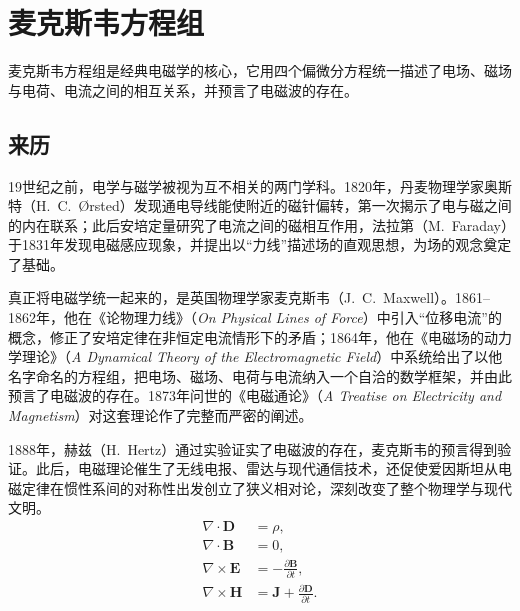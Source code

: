 \documentclass{ctexart} %
\begin{document}
\section{麦克斯韦方程组}

麦克斯韦方程组是经典电磁学的核心，它用四个偏微分方程统一描述了电场、磁场与电荷、电流之间的相互关系，并预言了电磁波的存在\cite{maxwell1865}。
\subsection*{来历}
19世纪之前，电学与磁学被视为互不相关的两门学科。1820年，丹麦物理学家奥斯特（H.~C.~Ørsted）发现通电导线能使附近的磁针偏转，第一次揭示了电与磁之间的内在联系；此后安培定量研究了电流之间的磁相互作用，法拉第（M.~Faraday）于1831年发现电磁感应现象，并提出以“力线”描述场的直观思想，为场的观念奠定了基础。

真正将电磁学统一起来的，是英国物理学家麦克斯韦（J.~C.~Maxwell）。1861--1862年，他在《论物理力线》（\textit{On Physical Lines of Force}）中引入“位移电流”的概念，修正了安培定律在非恒定电流情形下的矛盾；1864年，他在《电磁场的动力学理论》（\textit{A Dynamical Theory of the Electromagnetic Field}）中系统给出了以他名字命名的方程组\cite{maxwell1865}，把电场、磁场、电荷与电流纳入一个自洽的数学框架，并由此预言了电磁波的存在。1873年问世的《电磁通论》（\textit{A Treatise on Electricity and Magnetism}）对这套理论作了完整而严密的阐述。

1888年，赫兹（H.~Hertz）通过实验证实了电磁波的存在，麦克斯韦的预言得到验证。此后，电磁理论催生了无线电报、雷达与现代通信技术，还促使爱因斯坦从电磁定律在惯性系间的对称性出发创立了狭义相对论，深刻改变了整个物理学与现代文明。
\begin{equation}
\begin{split}
    \nabla \cdot \mathbf{D} &= \rho, \\
    \nabla \cdot \mathbf{B} &= 0, \\
    \nabla \times \mathbf{E} &= -\frac{\partial \mathbf{B}}{\partial t}, \\
    \nabla \times \mathbf{H} &= \mathbf{J} + \frac{\partial \mathbf{D}}{\partial t}.
\end{split}
\label{maxwell}
\end{equation}
\end{document}
